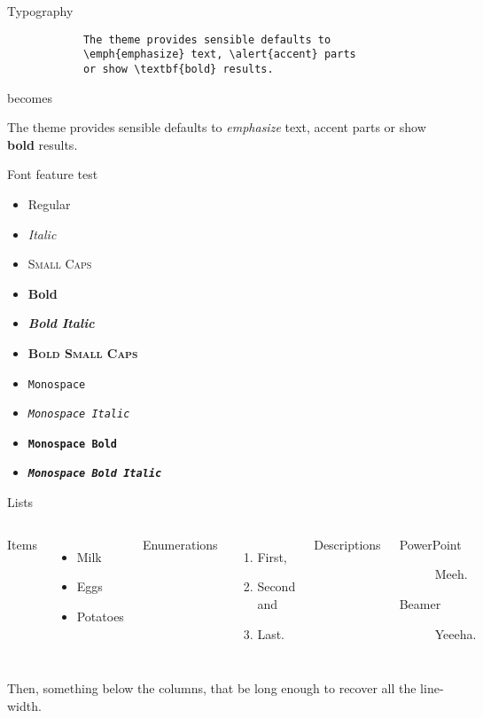 \documentclass[aspectratio=169]{beamer}
\begin{document}
	\begin{frame}[fragile]{Typography}
		\begin{verbatim}
			The theme provides sensible defaults to
			\emph{emphasize} text, \alert{accent} parts
			or show \textbf{bold} results.
		\end{verbatim}
		
		\begin{center}becomes\end{center}
		
		The theme provides sensible defaults to \emph{emphasize} text,
		\alert{accent} parts or show \textbf{bold} results.
	\end{frame}
		
	\begin{frame}{Font feature test}
		\begin{itemize}
			\item Regular
			\item \textit{Italic}
			\item \textsc{Small Caps}
			\item \textbf{Bold}
			\item \textbf{\textit{Bold Italic}}
			\item \textbf{\textsc{Bold Small Caps}}
			\item \texttt{Monospace}
			\item \texttt{\textit{Monospace Italic}}
			\item \texttt{\textbf{Monospace Bold}}
			\item \texttt{\textbf{\textit{Monospace Bold Italic}}}
		\end{itemize}
	\end{frame}
		
	\begin{frame}{Lists}
		\begin{columns}[T,onlytextwidth]
				Items
				\begin{itemize}
		  \item Milk \item Eggs \item Potatoes
				\end{itemize}
			
				Enumerations
				\begin{enumerate}
		  \item First, \item Second and \item Last.
				\end{enumerate}
			
				Descriptions
				\begin{description}
		  \item[PowerPoint] Meeh. \item[Beamer] Yeeeha.
				\end{description}
		\end{columns}
		
		\vspace{1em}
		Then, something below the columns, that be long enough to recover all the line-width.
	\end{frame}
	
\end{document}
